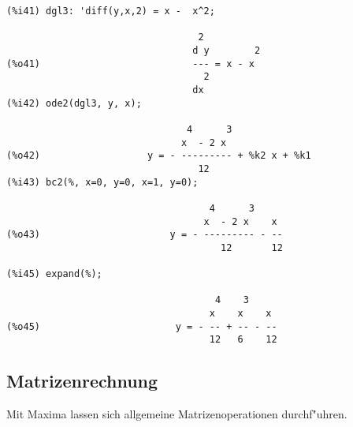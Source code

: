 \documentclass[spanish,12pt,a4paper]{article}
\begin{document}
\scriptsize
\begin{verbatim}
(%i41) dgl3: 'diff(y,x,2) = x -  x^2;

                                  2
                                 d y        2
(%o41)                           --- = x - x
                                   2
                                 dx
(%i42) ode2(dgl3, y, x);

                                4      3
                               x  - 2 x
(%o42)                   y = - --------- + %k2 x + %k1
                                  12
(%i43) bc2(%, x=0, y=0, x=1, y=0);

                                    4      3
                                   x  - 2 x    x
(%o43)                       y = - --------- - --
                                      12       12

(%i45) expand(%);

                                     4    3
                                    x    x    x
(%o45)                        y = - -- + -- - --
                                    12   6    12
\end{verbatim}
\normalsize

\subsection{Matrizenrechnung}

Mit Maxima lassen sich allgemeine Matrizenoperationen durchf"uhren.
\end{document}
